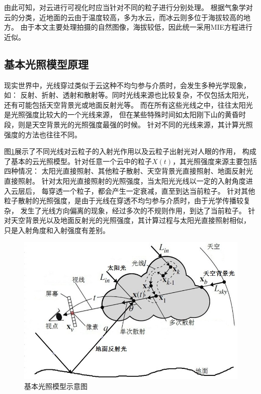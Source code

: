 由此可知，对云进行可视化时应当针对不同的粒子进行分别处理。
根据气象学对云的分类，近地面的云由于温度较高，多为水云，而冰云则多位于海拔较高的地方。
由于本文主要处理拍摄的自然图像，海拔较低，因此统一采用MIE方程进行近似。


\subsection{基本光照模型原理}

现实世界中，光线穿过类似于云这种不均匀参与介质时，会发生多种光学现象，如：
反射、折射、透射和散射等。同时光线来源也比较复杂，不仅包括太阳光，
还有可能包括天空背景光或地面反射光等。
而在所有这些光线之中，往往太阳光是光照强度比较大的一个光线来源，
但在某些特殊时间如太阳刚下山的黄昏时段，则是天空背景光的光照强度最强的时候。
针对不同的光线来源，其计算光照强度的方法也往往不同。

图\ref{fig:base_light_model}展示了不同光线对云粒子的入射光作用以及云粒子出射光对人眼的作用，
构成了基本的云光照模型。针对任意一个云中的粒子$X(t)$，其光照强度来源主要包括四种情况：
太阳光直接照射、其他粒子散射、天空背景光直接照射、地面反射光直接照射。
针对太阳光直接照射的光照强度，当太阳光光线以一定的入射角度进入云层后，
每穿透一个粒子，都会产生一定衰减，直至到达当前粒子。
针对其他粒子散射的光照强度，是由于光线在穿透不均匀参与介质时，由于光学传播较复杂，
发生了光线方向偏离的现象，经过多次的不规则作用，到达了当前粒子。
针对天空背景光以及地面反射光的光照强度，其计算过程与太阳光直接照射相似，
只是入射角度和入射强度有差别。

\begin{figure}
	\centering
	\includegraphics{figure/base_light_model.jpg}
	\caption{基本光照模型示意图}
	\label{fig:base_light_model}
\end{figure}

